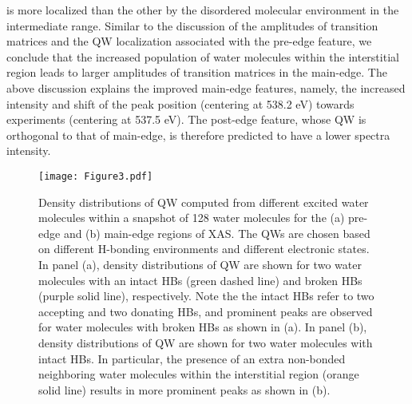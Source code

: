 \documentclass[prb,twocolumn,showpacs,preprintnumbers,superscriptaddress,amsmath,amssymb]{revtex4}
\begin{document}
is more localized than the other by the disordered molecular environment in the intermediate range.
Similar to the discussion of the amplitudes of transition matrices and the QW localization
associated with the pre-edge feature,
we conclude that the increased population of water molecules within the interstitial region leads to larger amplitudes of transition matrices in the main-edge.
The above discussion explains the improved main-edge features, namely, the increased intensity and shift of the peak position (centering at 538.2 eV) towards experiments (centering at 537.5 eV).
The post-edge feature, whose QW is orthogonal to that of main-edge, is therefore predicted to have a lower spectra intensity.

\begin{figure}
  \texttt{[image: Figure3.pdf]}
  \caption{Density distributions of QW computed from different excited water molecules
 within a snapshot of 128 water molecules for the (a)
 pre-edge and (b) main-edge regions of XAS.
 The QWs are chosen based on different H-bonding environments and
 different electronic states.
 In panel (a), density distributions of QW are shown for
 two water molecules with an intact HBs (green dashed line) and broken HBs (purple solid line), respectively.
 Note the the intact HBs refer to two accepting and two donating HBs, and prominent peaks are observed for
 water molecules with broken HBs as shown in (a).
 In panel (b), density distributions of QW are shown for
 two water molecules with intact HBs.
 In particular, the presence of an extra non-bonded neighboring water molecules within
 the interstitial region (orange solid line) results in more prominent peaks as shown in (b).
}
  \label{fig3}
\end{figure}
\end{document}
